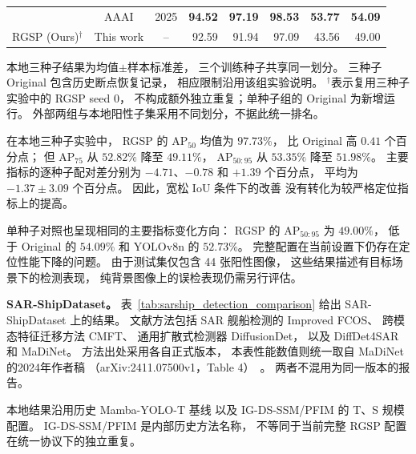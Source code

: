 \documentclass[journal]{IEEEtran}
\begin{document}
\begin{table}[!t]
\begin{tabular*}{\textwidth}{@{\extracolsep{\fill}}lccrrrrr}
& AAAI & 2025
& \textbf{94.52} & \textbf{97.19} & \textbf{98.53} & \textbf{53.77} & \textbf{54.09} \\
RGSP (Ours)$^{\dagger}$
& This work & --
& 92.59 & 91.94 & 97.09 & 43.56 & 49.00 \\
\bottomrule
\end{tabular*}
\smallskip
\begin{minipage}{\linewidth}
\footnotesize
本地三种子结果为均值$\pm$样本标准差，
三个训练种子共享同一划分。
三种子 Original 包含历史断点恢复记录，
相应限制沿用该组实验说明。
$^{\dagger}$表示复用三种子实验中的 RGSP seed 0，
不构成额外独立重复；单种子组的 Original 为新增运行。
外部两组与本地阳性子集采用不同划分，不据此统一排名。
\end{minipage}
\end{table}

在本地三种子实验中，
RGSP 的 AP$_{50}$ 均值为 $97.73\%$，
比 Original 高 $0.41$ 个百分点；
但 AP$_{75}$ 从 $52.82\%$ 降至 $49.11\%$，
AP$_{50:95}$ 从 $53.35\%$ 降至 $51.98\%$。
主要指标的逐种子配对差分别为
$-4.71$、$-0.78$ 和 $+1.39$ 个百分点，
平均为 $-1.37\pm3.09$ 个百分点。
因此，宽松 IoU 条件下的改善
没有转化为较严格定位指标上的提高。

单种子对照也呈现相同的主要指标变化方向：
RGSP 的 AP$_{50:95}$ 为 $49.00\%$，
低于 Original 的 $54.09\%$
和 YOLOv8n 的 $52.73\%$。
完整配置在当前设置下仍存在定位性能下降的问题。
由于测试集仅包含 44 张阳性图像，
这些结果描述有目标场景下的检测表现，
纯背景图像上的误检表现仍需另行评估。

\textbf{SAR-ShipDataset。}
表~\ref{tab:sarship_detection_comparison}
给出 SAR-ShipDataset 上的结果。
文献方法包括 SAR 舰船检测的 Improved FCOS、
跨模态特征迁移方法 CMFT、
通用扩散式检测器 DiffusionDet，
以及 DiffDet4SAR 和 MaDiNet。
方法出处采用各自正式版本，
本表性能数值则统一取自 MaDiNet 的2024年作者稿
（arXiv:2411.07500v1，Table 4）~\cite{madinet_preprint}。
两者不混用为同一版本的报告。

本地结果沿用历史 Mamba-YOLO-T 基线
以及 IG-DS-SSM/PFIM 的 T、S 规模配置。
IG-DS-SSM/PFIM 是内部历史方法名称，
不等同于当前完整 RGSP 配置在统一协议下的独立重复。
\end{document}
